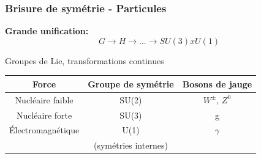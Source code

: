 \documentclass[handout]{beamer}
\begin{document}
\begin{frame}\frametitle{Brisure de symétrie - Particules}

 \textbf{Grande unification:}
\begin{equation*}
G \rightarrow H \rightarrow ... \rightarrow SU(3) x U(1)
\end{equation*}

\begin{block}{Groupes de Lie, transformations continues}
\begin{tabular}{ccc}
 Force & Groupe de symétrie & Bosons de jauge \\
  \hline
  Nucléaire faible & SU(2) & $W^{\pm}$, $Z^0$ \\
  Nucléaire forte & SU(3)& g \\
  Électromagnétique & U(1) &  $\gamma$\\
  &(symétries internes)&
 \end{tabular}
\end{block}






  

\end{frame}
%
  
\end{document}
